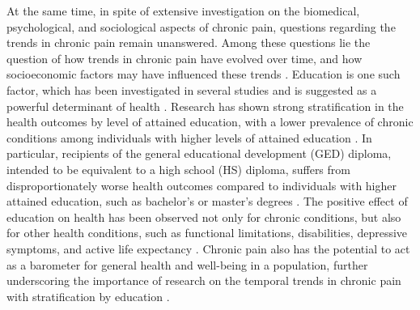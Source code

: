 At the same time, in spite of extensive investigation on the biomedical, psychological, and sociological aspects of chronic pain, questions regarding the trends in chronic pain remain unanswered. Among these questions lie the question of how trends in chronic pain have evolved over time, and how socioeconomic factors may have influenced these trends \citep{Zajacova2021-ee}. Education is one such factor, which has been investigated in several studies and is suggested as a powerful determinant of health \citep{mirowsky2017education}. Research has shown strong stratification in the health outcomes by level of attained education, with a lower prevalence of chronic conditions among individuals with higher levels of attained education \citep{dionne2001formal,kennedy2014prevalence}. In particular, recipients of the general educational development (GED) diploma, intended to be equivalent to a high school (HS) diploma, suffers from disproportionately worse health outcomes compared to individuals with higher attained education, such as bachelor's or master's degrees \citep{ZAJACOVA20201270}. The positive effect of education on health has been observed not only for chronic conditions, but also for other health conditions, such as functional limitations, disabilities, depressive symptoms, and active life expectancy \citep{montez2012educational,lorant2003socioeconomic,schoeni2005persistent}. Chronic pain also has the potential to act as a barometer for general health and well-being in a population, further underscoring the importance of research on the temporal trends in chronic pain with stratification by education \citep{sociology}.

